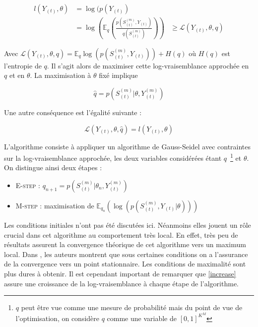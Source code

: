 \documentclass[10pt,a4paper]{article}
\newcommand{\Estep}{\textsc{E-step}}
\newcommand{\Mstep}{\textsc{M-step}}
\begin{document}
\begin{equation}
\begin{aligned}
l(Y_{(t)},\theta)&=\log(p(Y_{(t)}) \\
&=\log\left( \mathbb{E}_q\left( 
\frac{p(S_{(t)}^{(m)},Y_{(t)})}{q(S_{(t)}^{(m)})} \right) \right)
&\ge \mathcal{L}(Y_{(t)},\theta,q)
\end{aligned}
\end{equation}

Avec $\mathcal{L}(Y_{(t)},\theta,q)=\mathbb{E}_q \log \left( p(S_{(t)}^{(m)}, 
Y_{(t)})\right)+H(q)$ où $H(q)$ est l'entropie de $q$. Il s'agit alors de 
maximiser cette log-vraisemblance approchée en $q$ et en $\theta$. La 
maximisation à $\theta$ fixé implique 

\begin{equation}
\hat{q}=p(S_{(t)}^{(m)} \vert \theta,Y_{(t)}^{(m)})
\end{equation} 

Une autre conséquence est l'égalité suivante :

\begin{equation}
\mathcal{L}(Y_{(t)},\theta,\hat{q})=l(Y_{(t)},\theta) \label{increase}
\end{equation}

L'algorithme consiste à appliquer un algorithme de Gauss-Seidel avec 
contraintes sur la log-vraisemblance approchée, les deux variables considérées 
étant $q$~\footnote{%
$q$ peut être vue comme une mesure de probabilité mais du
point de vue de l'optimisation, on considère $q$ comme une variable de
$[0,1]^{K^M}$}
et $\theta$.
On distingue ainsi deux étapes :

\begin{itemize}
  \item \Estep{} : $q_{n+1}=p(S_{(t)}^{(m)} \vert \theta_n,Y_{(t)}^{(m)})$
  \item \Mstep{} : maximisation de $\mathbb{E}_{q_n} \left( \log \left( 
    p(S_{(t)}^{(m)}, Y_{(t)}  \vert  \theta )\right) \right)$
\end{itemize}

Les conditions initiales n'ont pas été discutées ici. Néanmoins elles jouent un 
rôle crucial dans cet algorithme au comportement très local. En effet, très peu 
de résultats assurent la convergence théorique de cet algorithme vers un 
maximum local. Dans \cite{wu1983convergence}, les auteurs montrent que sous 
certaines conditions on a l'assurance de la convergence vers un point 
stationnaire. Les conditions de maximalité sont plus dures à obtenir. Il est 
cependant important de remarquer que \ref{increase} assure une croissance de la 
log-vraisemblance à chaque étape de l'algorithme.
\end{document}
